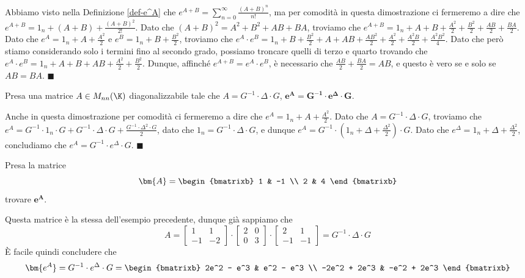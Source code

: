 \documentclass[11pt, a4paper, titlepage, oneside]{scrbook}
\begin{document}
Abbiamo visto nella Definizione \ref{def-e^A} che $e^{A+B} = \sum_{n = 0}^\infty \frac{(A+B)^n}{n!}$, ma per comodità in questa dimostrazione ci fermeremo a dire che $e^{A+B} =  1_n + (A + B) + \frac{(A+B)^2}{2!}$. 
Dato che $(A+B)^2 = A^2 + B^2 + AB + BA$, troviamo che $e^{A+B} = 1_n + A + B + \frac{A^2}{2} + \frac{B^2}{2} + \frac{AB}{2} + \frac{BA}{2}$. Dato che $e^A = 1_n + A + \frac{A^2}{2}$ e $e^B = 1_n + B + \frac{B^2}{2}$, troviamo che $e^A \cdot e^B = 1_n + B + \frac{B^2}{2} + A + AB + \frac{AB^2}{2} + \frac{A^2}{2} + \frac{A^2 B}{2} + \frac{A^2B^2}{4}$. Dato che però stiamo considerando solo i termini fino al secondo grado, possiamo troncare quelli di terzo e quarto trovando che $e^A \cdot e^B = 1_n + A + B + AB + \frac{A^2}{2} + \frac{B^2}{2}$.
Dunque, affinché $e^{A+B} = e^A \cdot e^B$, è necessario che $\frac{AB}{2} + \frac{BA}{2} = AB$, e questo è vero se e solo se $AB = BA$. $\blacksquare$

\begin{Proposizione}[]
\label{propos-e^A-diagonalizzazione}
Presa una matrice $A \in M_{nn}(\K)$ diagonalizzabile tale che $A = G^{-1} \cdot \Delta \cdot G$, $\bm{e^A = G^{-1} \cdot e^\Delta \cdot G}$.
\end{Proposizione}

\Dimostrazione \nopagebreak

Anche in questa dimostrazione per comodità ci fermeremo a dire che $e^A = 1_n + A + \frac{A^2}{2}$. Dato che $A = G^{-1} \cdot \Delta \cdot G$, troviamo che $e^A = G^{-1} \cdot 1_n \cdot G + G^{-1} \cdot \Delta \cdot G + \frac{G^{-1} \cdot \Delta^2 \cdot G}{2}$, dato che $1_n = G^{-1} \cdot \Delta \cdot G$, e dunque $e^A = G^{-1} \cdot (1_n + \Delta + \frac{\Delta^2}{2}) \cdot G$. Dato che $e^\Delta = 1_n + \Delta + \frac{\Delta^2}{2}$, concludiamo che $e^A = G^{-1} \cdot e^\Delta \cdot G$. $\blacksquare$  

\Esempio \nopagebreak

Presa la matrice \nopagebreak
\[ \bm{A} = 
\begin{bmatrixb}
    1 & -1 \\
    2 & 4
\end{bmatrixb}
\]
trovare $\bm{e^A}$. \nopagebreak

Questa matrice è la stessa dell'esempio precedente, dunque già sappiamo che
\[
A = \begin{bmatrix}
    1 & 1 \\
    -1 & -2
\end{bmatrix} \cdot \begin{bmatrix}
    2 & 0 \\
    0 & 3
\end{bmatrix} \cdot \begin{bmatrix}
    2 & 1 \\
    -1 & -1
\end{bmatrix} = G^{-1} \cdot \Delta \cdot G
\]
È facile quindi concludere che 
\[
\bm{e^A} = G^{-1} \cdot e^\Delta \cdot G = \begin{bmatrixb}
    2e^2 - e^3 & e^2 - e^3 \\
    -2e^2 + 2e^3 & -e^2 + 2e^3
\end{bmatrixb}
\]
\end{document}
